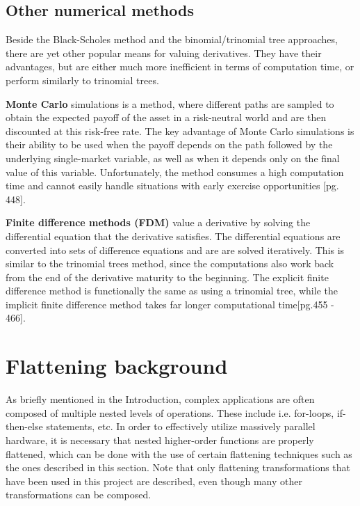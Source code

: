 \subsection{Other numerical methods}
Beside the Black-Scholes method and the binomial/trinomial tree approaches, there are yet other popular means for valuing derivatives. They have their advantages, but are either much more inefficient in terms of computation time, or perform similarly to trinomial trees. 

\textbf{Monte Carlo} simulations is a method, where different paths are sampled to obtain the expected payoff of the asset in a risk-neutral world and are then discounted at this risk-free rate. The key advantage of Monte Carlo simulations is their ability to be used when the payoff depends on the path followed by the underlying single-market variable, as well as when it depends only on the final value of this variable. Unfortunately, the method consumes a high computation time and cannot easily handle situations with early exercise opportunities \cite{ofod}[pg. 448].   

\textbf{Finite difference methods (FDM)} value a derivative by solving the differential equation that the derivative satisfies. The differential equations are converted into sets of difference equations and are are solved iteratively. This is similar to the trinomial trees method, since the computations also work back from the end of the derivative maturity to the beginning. The explicit finite difference method is functionally the same as using a trinomial tree, while the implicit finite difference method takes far longer computational time\cite{ofod}[pg.455 - 466].

\section{Flattening background}
As briefly mentioned in the Introduction, complex applications are often composed of multiple nested levels of operations. These include i.e. for-loops, if-then-else statements, etc. In order to effectively utilize massively parallel hardware, it is necessary that nested higher-order functions are properly flattened, which can be done with the use of certain flattening techniques such as the ones described in this section. Note that only flattening transformations that have been used in this project are described, even though many other transformations can be composed.  

